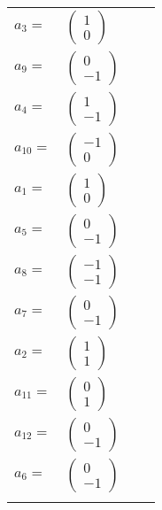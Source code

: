\documentclass[1p]{elsarticle_modified}
\theoremstyle{definition}
\begin{document}
\begin{tabular}{m{7pt} m{180pt} m{7pt} m{180pt} }
\flushright $a_{3}=$&$\begin{pmatrix}1\\0\end{pmatrix}$ \\
\flushright $a_{9}=$&$\begin{pmatrix}0\\-1\end{pmatrix}$ \\
\flushright $a_{4}=$&$\begin{pmatrix}1\\-1\end{pmatrix}$ \\
\flushright $a_{10}=$&$\begin{pmatrix}-1\\0\end{pmatrix}$ \\
\flushright $a_{1}=$&$\begin{pmatrix}1\\0\end{pmatrix}$ \\
\flushright $a_{5}=$&$\begin{pmatrix}0\\-1\end{pmatrix}$ \\
\flushright $a_{8}=$&$\begin{pmatrix}-1\\-1\end{pmatrix}$ \\
\flushright $a_{7}=$&$\begin{pmatrix}0\\-1\end{pmatrix}$ \\
\flushright $a_{2}=$&$\begin{pmatrix}1\\1\end{pmatrix}$ \\
\flushright $a_{11}=$&$\begin{pmatrix}0\\1\end{pmatrix}$ \\
\flushright $a_{12}=$&$\begin{pmatrix}0\\-1\end{pmatrix}$ \\
\flushright $a_{6}=$&$\begin{pmatrix}0\\-1\end{pmatrix}$\\&\end{tabular}
\end{document}
